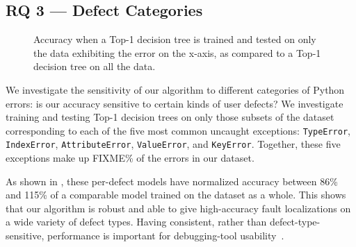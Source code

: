 \documentclass[conference]{IEEEtran}
\newcommand\lt[1]{{\lstinline|#1|}}
\begin{document}





\subsection{RQ 3 --- Defect Categories}

\begin{figure}
\caption{Accuracy when a Top-1 decision tree is trained and tested on only the data exhibiting
the error on the x-axis, as compared to a Top-1 decision tree on all the data.
}
\label{fig-defect-categories}
\end{figure}

We investigate the sensitivity of our algorithm to different categories of
Python errors: is our accuracy sensitive to certain kinds of user defects?
We investigate training and testing Top-1 decision trees on only those
subsets of the dataset corresponding to each of the five most common
uncaught exceptions: \lt{TypeError}, \lt{IndexError}, \lt{AttributeError},
\lt{ValueError}, and \lt{KeyError}. Together, these five exceptions make
up FIXME\% of the errors in our dataset.

As shown in , these per-defect models have
normalized accuracy between 86\% and 115\% of a comparable model trained on
the dataset as a whole. This shows that our algorithm is robust and able to
give high-accuracy fault localizations on a wide variety of defect types.
Having consistent, rather than defect-type-sensitive, performance is
important for debugging-tool
usability~\cite{orso-parnin,Bessey2010,ayewah10}.
\end{document}
